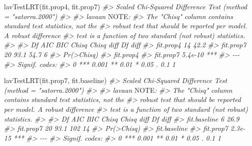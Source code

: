 \documentclass[
  11pt,
]{krantz}
\makeatletter
\newenvironment{Shaded}{\begin{snugshade}}{\end{snugshade}}
\newcommand{\AlertTok}[1]{\textcolor[rgb]{0.33,0.33,0.33}{#1}}
\newcommand{\CommentTok}[1]{\textcolor[rgb]{0.37,0.37,0.37}{\textit{#1}}}
\newcommand{\FunctionTok}[1]{\textcolor[rgb]{0,0,0}{#1}}
\newcommand{\NormalTok}[1]{#1}
\newenvironment{kframe}{%
\medskip{}
\setlength{\fboxsep}{.8em}
 \def\at@end@of@kframe{}%
 \ifinner\ifhmode%
  \def\at@end@of@kframe{\end{minipage}}%
  \begin{minipage}{\columnwidth}%
 \fi\fi%
 \def\FrameCommand##1{\hskip\@totalleftmargin \hskip-\fboxsep
 \colorbox{shadecolor}{##1}\hskip-\fboxsep
     \hskip-\linewidth \hskip-\@totalleftmargin \hskip\columnwidth}%
 \MakeFramed {\advance\hsize-\width
   \@totalleftmargin\z@ \linewidth\hsize
   \@setminipage}}%
 {\par\unskip\endMakeFramed%
 \at@end@of@kframe}
\renewenvironment{Shaded}{\begin{kframe}}{\end{kframe}}
\theoremstyle{definition}
\theoremstyle{definition}
\theoremstyle{definition}
\theoremstyle{definition}
\theoremstyle{remark}
\makeatother
\begin{document}
\begin{Shaded}
\begin{Highlighting}[]
\FunctionTok{lavTestLRT}\NormalTok{(fit.prop4, fit.prop7)}
\CommentTok{\#\textgreater{} Scaled Chi{-}Squared Difference Test (method = "satorra.2000")}
\CommentTok{\#\textgreater{} }
\CommentTok{\#\textgreater{} lavaan }\AlertTok{NOTE}\CommentTok{:}
\CommentTok{\#\textgreater{}     The "Chisq" column contains standard test statistics, not the}
\CommentTok{\#\textgreater{}     robust test that should be reported per model. A robust difference}
\CommentTok{\#\textgreater{}     test is a function of two standard (not robust) statistics.}
\CommentTok{\#\textgreater{}  }
\CommentTok{\#\textgreater{}           Df AIC BIC Chisq Chisq diff Df diff}
\CommentTok{\#\textgreater{} fit.prop4 14          42.2                   }
\CommentTok{\#\textgreater{} fit.prop7 20          93.1       54.7       6}
\CommentTok{\#\textgreater{}           Pr(\textgreater{}Chisq)    }
\CommentTok{\#\textgreater{} fit.prop4               }
\CommentTok{\#\textgreater{} fit.prop7    5.4e{-}10 ***}
\CommentTok{\#\textgreater{} {-}{-}{-}}
\CommentTok{\#\textgreater{} Signif. codes:  }
\CommentTok{\#\textgreater{} 0 \textquotesingle{}***\textquotesingle{} 0.001 \textquotesingle{}**\textquotesingle{} 0.01 \textquotesingle{}*\textquotesingle{} 0.05 \textquotesingle{}.\textquotesingle{} 0.1 \textquotesingle{} \textquotesingle{} 1}
\end{Highlighting}
\end{Shaded}

\begin{Shaded}
\begin{Highlighting}[]
\FunctionTok{lavTestLRT}\NormalTok{(fit.prop7, fit.baseline)}
\CommentTok{\#\textgreater{} Scaled Chi{-}Squared Difference Test (method = "satorra.2000")}
\CommentTok{\#\textgreater{} }
\CommentTok{\#\textgreater{} lavaan }\AlertTok{NOTE}\CommentTok{:}
\CommentTok{\#\textgreater{}     The "Chisq" column contains standard test statistics, not the}
\CommentTok{\#\textgreater{}     robust test that should be reported per model. A robust difference}
\CommentTok{\#\textgreater{}     test is a function of two standard (not robust) statistics.}
\CommentTok{\#\textgreater{}  }
\CommentTok{\#\textgreater{}              Df AIC BIC Chisq Chisq diff Df diff}
\CommentTok{\#\textgreater{} fit.baseline  6          26.9                   }
\CommentTok{\#\textgreater{} fit.prop7    20          93.1        102      14}
\CommentTok{\#\textgreater{}              Pr(\textgreater{}Chisq)    }
\CommentTok{\#\textgreater{} fit.baseline               }
\CommentTok{\#\textgreater{} fit.prop7       2.3e{-}15 ***}
\CommentTok{\#\textgreater{} {-}{-}{-}}
\CommentTok{\#\textgreater{} Signif. codes:  }
\CommentTok{\#\textgreater{} 0 \textquotesingle{}***\textquotesingle{} 0.001 \textquotesingle{}**\textquotesingle{} 0.01 \textquotesingle{}*\textquotesingle{} 0.05 \textquotesingle{}.\textquotesingle{} 0.1 \textquotesingle{} \textquotesingle{} 1}
\end{Highlighting}
\end{Shaded}
\end{document}
